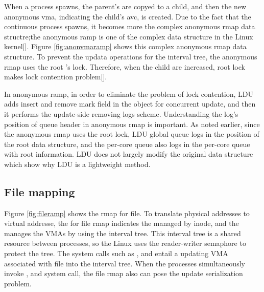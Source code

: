 When a process spawns, the parent's  are copyed
to a child, and then the new anonymous vma, indicating the child's avc, is
created.
Due to the fact that the continuous process spawns, it becomes more the complex
anonymous rmap data structre;the anonymous ramp is one of the complex data
structure in the Linux kernel[].
Figure \ref{fig:anonvmaramp} shows this complex anonymous rmap data
structure.
To prevent the updata operations for the interval tree, the anonymous rmap
uses the root 's lock. 
Therefore, when the child  are increased, root lock makes lock
contention problem[].

In anonymous ramp, in order to eliminate the problem of lock contention, LDU
adds insert and remove mark field in the  object for concurrent
update, and then it performs the update-side removing logs scheme.
Understanding the log's position of queue header in anonymous rmap is important.
As noted earlier, since the anonymous rmap uses the root lock, LDU global
queue logs in the position of the root data structure, and the per-core queue
also logs in the per-core queue with root information.
LDU does not largely modify the original data structure which show why LDU is a
lightweight method.

\subsection{File mapping}

Figure \ref{fig:fileramp} shows the rmap for file.
To translate physical addresses to virtual addresse, the  for
file rmap indicates the  managed by inode, and
the  manages the VMAs by using the interval tree.
This interval tree is a shared resource between processes, so the Linux uses the
reader-writer semaphore to protect the tree.
The system calls such as ,  and  entail
a updating VMA associated with file into the interval tree.
When the processes simultaneously invoke ,  and
 system call, the file rmap also can pose the update serialization
problem.

